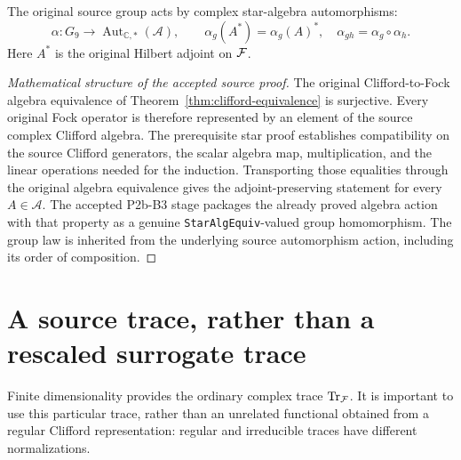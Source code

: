 \begin{theorem}
\label{thm:fock-star-action}
The original source group acts by complex star-algebra automorphisms:
\begin{equation}\label{eq:fock-star-action}
 \alpha:G_9\longrightarrow
 \operatorname{Aut}_{\mathbb C,*}(\mathscr A),
 \qquad
 \alpha_g(A^*)=\alpha_g(A)^*,\quad
 \alpha_{gh}=\alpha_g\circ\alpha_h.
\end{equation}
Here $A^*$ is the original Hilbert adjoint on $\mathcal F$.
\end{theorem}
\begin{proof}[Mathematical structure of the accepted source proof]
The original Clifford-to-Fock algebra equivalence of
Theorem~\ref{thm:clifford-equivalence} is surjective. Every original
Fock operator is therefore represented by an element of the source
complex Clifford algebra. The prerequisite star proof establishes
compatibility on the source Clifford generators, the scalar algebra
map, multiplication, and the linear operations needed for the
induction. Transporting those equalities through the original
algebra equivalence gives the adjoint-preserving statement for every
$A\in\mathscr A$. The accepted P2b-B3 stage packages the already
proved algebra action with that property as a genuine
\texttt{StarAlgEquiv}-valued group homomorphism. The group law is
inherited from the underlying source automorphism action, including
its order of composition.
\end{proof}

\section{A source trace, rather than a rescaled surrogate trace}
Finite dimensionality provides the ordinary complex trace
$\operatorname{Tr}_{\mathcal F}$. It is important to use this particular
trace, rather than an unrelated functional obtained from a regular
Clifford representation: regular and irreducible traces have different
normalizations.

